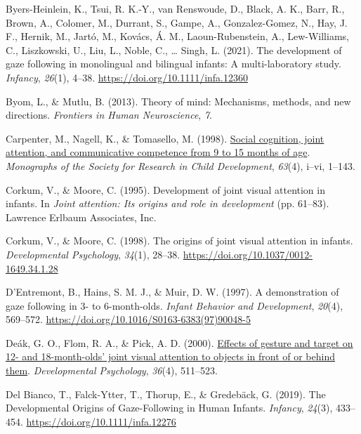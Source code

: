 \documentclass[
  man,mask,floatsintext]{apa7}
\newlength{\cslhangindent}
\newlength{\cslentryspacingunit} %
\newenvironment{CSLReferences}[2] %
 {%
  \setlength{\parindent}{0pt}
  \ifodd #1
  \let\oldpar\par
  \def\par{\hangindent=\cslhangindent\oldpar}
  \fi
  \setlength{\parskip}{#2\cslentryspacingunit}
 }%
 {}
\begin{document}
\begin{CSLReferences}{1}{0}
\leavevmode{}%
Byers-Heinlein, K., Tsui, R. K.-Y., van Renswoude, D., Black, A. K., Barr, R., Brown, A., Colomer, M., Durrant, S., Gampe, A., Gonzalez-Gomez, N., Hay, J. F., Hernik, M., Jartó, M., Kovács, Á. M., Laoun-Rubenstein, A., Lew-Williams, C., Liszkowski, U., Liu, L., Noble, C., \ldots{} Singh, L. (2021). The development of gaze following in monolingual and bilingual infants: {A} multi-laboratory study. \emph{Infancy}, \emph{26}(1), 4--38. \url{https://doi.org/10.1111/infa.12360}

\leavevmode{}%
Byom, L., \& Mutlu, B. (2013). Theory of mind: Mechanisms, methods, and new directions. \emph{Frontiers in Human Neuroscience}, \emph{7}.

\leavevmode{}%
Carpenter, M., Nagell, K., \& Tomasello, M. (1998). \href{https://www.ncbi.nlm.nih.gov/pubmed/9835078}{Social cognition, joint attention, and communicative competence from 9 to 15 months of age}. \emph{Monographs of the Society for Research in Child Development}, \emph{63}(4), i--vi, 1--143.

\leavevmode{}%
Corkum, V., \& Moore, C. (1995). Development of joint visual attention in infants. In \emph{Joint attention: {Its} origins and role in development} (pp. 61--83). Lawrence Erlbaum Associates, Inc.

\leavevmode{}%
Corkum, V., \& Moore, C. (1998). The origins of joint visual attention in infants. \emph{Developmental Psychology}, \emph{34}(1), 28--38. \url{https://doi.org/10.1037/0012-1649.34.1.28}

\leavevmode{}%
D'Entremont, B., Hains, S. M. J., \& Muir, D. W. (1997). A demonstration of gaze following in 3- to 6-month-olds. \emph{Infant Behavior and Development}, \emph{20}(4), 569--572. \url{https://doi.org/10.1016/S0163-6383(97)90048-5}

\leavevmode{}%
Deák, G. O., Flom, R. A., \& Pick, A. D. (2000). \href{https://www.ncbi.nlm.nih.gov/pubmed/10902702}{Effects of gesture and target on 12- and 18-month-olds' joint visual attention to objects in front of or behind them}. \emph{Developmental Psychology}, \emph{36}(4), 511--523.

\leavevmode{}%
Del Bianco, T., Falck-Ytter, T., Thorup, E., \& Gredebäck, G. (2019). The {Developmental Origins} of {Gaze-Following} in {Human Infants}. \emph{Infancy}, \emph{24}(3), 433--454. \url{https://doi.org/10.1111/infa.12276}


\end{CSLReferences}
\end{document}
